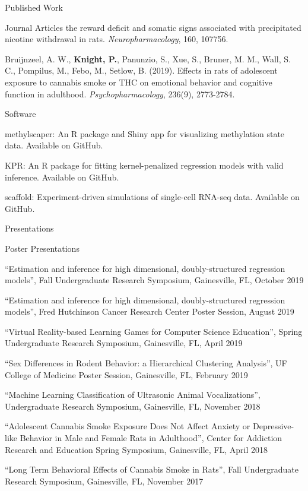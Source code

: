 \documentclass{resume}
\begin{document}
\begin{rSection}{Published Work}
\begin{rSubsection}{Journal Articles}{}{}{}
      the reward deficit and somatic signs associated with
      precipitated nicotine withdrawal in rats. \textit{Neuropharmacology},
      160, 107756.
    \item Bruijnzeel, A. W., \textbf{Knight, P.}, Panunzio, S., Xue, S.,
      Bruner, M. M., Wall, S. C., Pompilus, M., Febo, M., Setlow, B. (2019). Effects in
      rats of adolescent exposure to cannabis smoke or THC on
      emotional behavior and cognitive function in
      adulthood. \textit{Psychopharmacology}, 236(9), 2773-2784.
    \end{rSubsection}
    \begin{rSubsection}{Software}{}{}{}
	\item methylscaper: An R package and Shiny app for visualizing methylation state data.     Available on GitHub.
	\item KPR: An R package for fitting kernel-penalized regression models with valid inference. Available on GitHub.
	\item scaffold: Experiment-driven simulations of single-cell RNA-seq data. Available on GitHub.
    \end{rSubsection}
    \end{rSection}

\begin{rSection}{Presentations}
  \begin{rSubsection}{Poster Presentations}{}{}{} %
    \item ``Estimation and inference for high dimensional,
      doubly-structured regression models'', Fall Undergraduate
      Research Symposium, Gainesville, FL, October 2019
    \item  ``Estimation and inference for high dimensional,
      doubly-structured regression models'', Fred Hutchinson Cancer Research Center Poster Session, August 2019
      \item ``Virtual Reality-based Learning Games for Computer Science Education'', Spring Undergraduate Research Symposium, Gainesville, FL, April 2019 
      \item ``Sex Differences in Rodent Behavior: a Hierarchical Clustering Analysis'', UF College of Medicine Poster Session, Gainesville, FL, February 2019
      \item ``Machine Learning Classification of Ultrasonic Animal Vocalizations'', Undergraduate Research Symposium, Gainesville, FL, November 2018
      \item ``Adolescent Cannabis Smoke Exposure Does Not Affect
        Anxiety or Depressive-like Behavior in Male and Female Rats in
        Adulthood'', Center for Addiction Research and Education Spring Symposium, Gainesville, FL, April 2018
      \item``Long Term Behavioral Effects of Cannabis Smoke in Rats'',
        Fall Undergraduate Research Symposium, Gainesville, FL, November 2017
  \end{rSubsection}
  \end{rSection}
\end{document}
